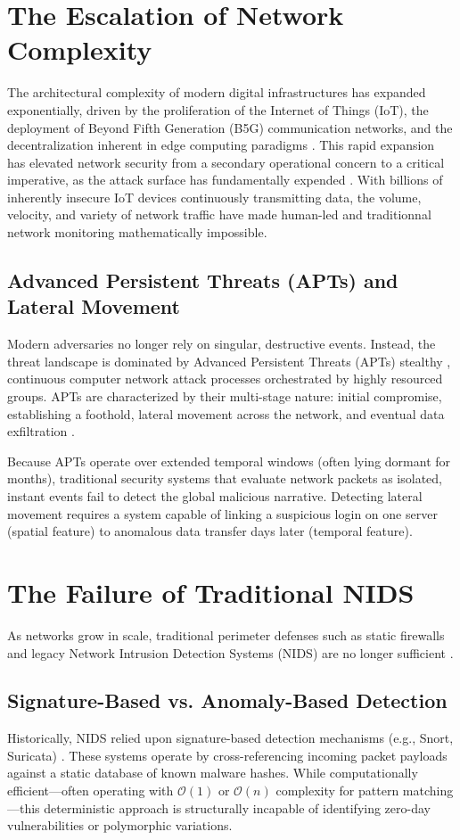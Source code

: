 \documentclass[12pt, a4paper]{report}
\begin{document}
\section{The Escalation of Network Complexity}
The architectural complexity of modern digital infrastructures has expanded exponentially, driven by the proliferation of the Internet of Things (IoT), the deployment of Beyond Fifth Generation (B5G) communication networks, and the decentralization inherent in edge computing paradigms \cite{iot_security_2025}. This rapid expansion has elevated network security from a secondary operational concern to a critical imperative, as the attack surface has fundamentally expended \cite{ids_overview_2025}. With billions of inherently insecure IoT devices continuously transmitting data, the volume, velocity, and variety of network traffic have made human-led and traditionnal  network monitoring mathematically impossible.

\subsection{Advanced Persistent Threats (APTs) and Lateral Movement}
Modern adversaries no longer rely on singular, destructive events. Instead, the threat landscape is dominated by Advanced Persistent Threats (APTs) stealthy ,  continuous computer network attack processes orchestrated by highly resourced groups. APTs are characterized by their multi-stage nature: initial compromise, establishing a foothold, lateral movement across the network, and eventual data exfiltration \cite{alshamrani2019survey}. 

Because APTs operate over extended temporal windows (often lying dormant for months), traditional security systems that evaluate network packets as isolated, 
instant  events fail to detect the global malicious narrative. Detecting lateral movement requires a system capable of linking a suspicious login on one server (spatial feature) to anomalous data transfer days later (temporal feature)\cite{king2023euler}.

\section{The Failure of Traditional NIDS}
As networks grow in scale, traditional perimeter defenses such as static firewalls and legacy Network Intrusion Detection Systems (NIDS) are no longer sufficient \cite{rose2020zero}\cite{ahmad2021network}. 

\subsection{Signature-Based vs. Anomaly-Based Detection}
Historically, NIDS relied upon signature-based detection mechanisms (e.g., Snort, Suricata) \cite{roesch1999snort}. These systems operate by cross-referencing incoming packet payloads against a static database of known malware hashes. While computationally efficient---often operating with $\mathcal{O}(1)$ or $\mathcal{O}(n)$ complexity for pattern matching---this deterministic approach is structurally incapable of identifying zero-day vulnerabilities or polymorphic variations.
\end{document}
